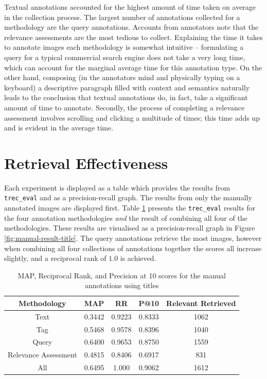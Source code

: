 Textual annotations accounted for the highest amount of time taken on average in the collection process. The largest number of annotations collected for a methodology are the query annotations. Accounts from annotators note that the relevance assessments are the most tedious to collect. Explaining the time it takes to annotate images each methodology is somewhat intuitive -- formulating a query for a typical commercial search engine does not take a very long time, which can account for the marginal average time for this annotation type. On the other hand, composing (in the annotators mind and physically typing on a keyboard) a descriptive paragraph filled with context and semantics naturally leads to the conclusion that textual annotations do, in fact, take a significant amount of time to annotate. Secondly, the process of completing a relevance assessment involves scrolling and clicking a multitude of times; this time adds up and is evident in the average time.

\FloatBarrier
\section{Retrieval Effectiveness}

Each experiment is displayed as a table which provides the results from \verb|trec_eval| and as a precision-recall graph. The results from only the manually annotated images are displayed first. Table \ref{table:manual-results-title} presents the \verb|trec_eval| results for the four annotation methodologies \textit{and} the result of combining all four of the methodologies. These results are visualised as a precision-recall graph in Figure \ref{fig:manual-result-title}. The query annotations retrieve the most images, however when combining all four collections of annotations together the scores all increase slightly, and a reciprocal rank of $1.0$ is achieved.

\begin{table}[ht]
    \centering
    \begin{tabular}{|c|c|c|c|c|}
        \hline
         Methodology & MAP & RR & P@10 & Relevant Retrieved \\ \hline
         Text & 0.3442 & 0.9223 & 0.8333 & 1062 \\ \hline
         Tag & 0.5468 & 0.9578 & 0.8396 & 1040 \\ \hline
         Query & 0.6400 & 0.9653 & 0.8750 & 1559 \\ \hline
         Relevance Assessment & 0.4815 & 0.8406 & 0.6917 & 831 \\ \hline
         All & 0.6495 & 1.000 & 0.9062 & 1612 \\ \hline
    \end{tabular}
    \caption{MAP, Reciprocal Rank, and Precision at 10 scores for the manual annotations using titles}
    \label{table:manual-results-title}
\end{table}


